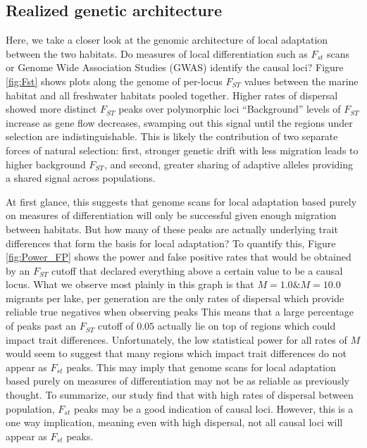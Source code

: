 \documentclass{article}
\begin{document}
\subsection*{Realized genetic architecture}

Here, we take a closer look at the genomic architecture of local adaptation between the two habitats. 
Do measures of local differentiation such as $F_{st}$ scans or Genome Wide Association Studies (GWAS) identify the causal loci? 
Figure \ref{fig:Fst} shows plots along the genome of per-locus $F_{ST}$ values between the marine habitat and all freshwater habitats pooled together.
Higher rates of dispersal showed more distinct $F_{ST}$ peaks over polymorphic loci 
``Background'' levels of $F_{ST}$ increase as gene flow decreases,
swamping out this signal until the regions under selection are indistinguishable. 
This is likely the contribution of two separate forces of natural selection: 
first, stronger genetic drift with less migration leads to higher background $F_{ST}$, and 
second, greater sharing of adaptive alleles providing a shared signal across populations.

At first glance, this suggests that genome scans for local adaptation based purely on measures of differentiation 
will only be successful given enough migration between habitats. 
But how many of these peaks are actually underlying trait differences that form the basis for local adaptation?
To quantify this, Figure \ref{fig:Power_FP} shows the power and false positive rates 
that would be obtained by an $F_{ST}$ cutoff 
that declared everything above a certain value to be a causal locus.
What we observe most plainly in this graph is that $M = 1.0 \& M = 10.0$ migrants per lake, per generation
are the only rates of dispersal which provide reliable true negatives when observing peaks
This means that a large percentage of peaks past an $F_{ST}$ cutoff of $0.05$ 
actually lie on top of regions which could impact trait differences. 
Unfortunately, the low statistical power for all rates of $M$ would seem to suggest
that many regions which impact trait differences do not appear as $F_{st}$ peaks. 
This may imply that genome scans for local adaptation based purely on measures of differentiation may not be as reliable as previously thought.
To summarize, our study find that with high rates of dispersal between population, $F_{st}$ peaks may be a good indication of causal loci.
However, this is a one way implication, meaning even with high dispersal, not all causal loci will appear as $F_{st}$ peaks.
\end{document}
